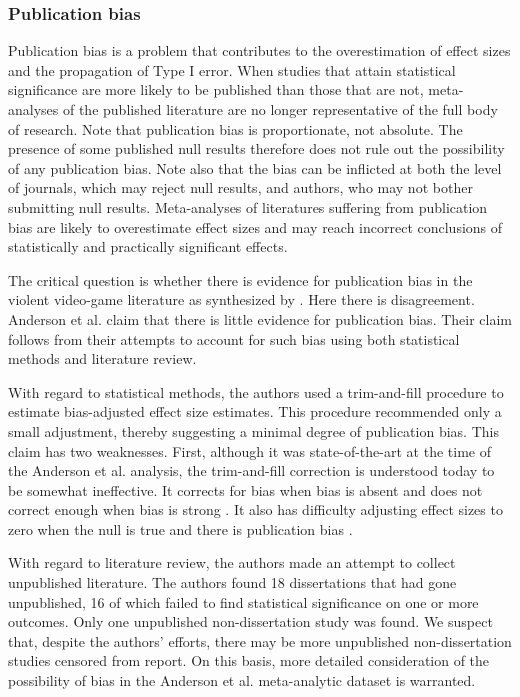 \documentclass[jou]{apa6}
\begin{document}
\subsubsection{Publication bias}
Publication bias is a problem that contributes to the overestimation of effect sizes and the propagation of Type I error. When studies that attain statistical significance are more likely to be published than those that are not, meta-analyses of the published literature are no longer representative of the full body of research. Note that publication bias is proportionate, not absolute. The presence of some published null results therefore does not rule out the possibility of any publication bias. Note also that the bias can be inflicted at both the level of journals, which may reject null results, and authors, who may not bother submitting null results.
Meta-analyses of literatures suffering from publication bias are likely to overestimate effect sizes and may reach incorrect conclusions of statistically and practically significant effects.

The critical question is whether there is evidence for publication bias in the violent video-game literature as synthesized by \citet{Anderson:etal:2010}.  Here there is disagreement.  Anderson et al. claim that there is little evidence for publication bias.  Their claim follows from their attempts to account for such bias using both statistical methods and literature review.  

With regard to statistical methods, the authors used a trim-and-fill procedure to estimate bias-adjusted effect size estimates. This procedure recommended only a small adjustment, thereby suggesting a minimal degree of publication bias. This claim has two weaknesses. First, although it was state-of-the-art at the time of the Anderson et al. analysis, the trim-and-fill correction is understood today to be somewhat ineffective. It corrects for bias when bias is absent and does not correct enough when bias is strong \citep{Simonsohn:etal:2014b,vanAssen:etal:2015}. It also has difficulty adjusting effect sizes to zero when the null is true and there is publication bias \citep{Moreno:etal:2009,vanAssen:etal:2015}. 

With regard to literature review, the authors made an attempt to collect unpublished literature. The authors found 18 dissertations that had gone unpublished, 16 of which failed to find statistical significance on one or more outcomes. Only one unpublished non-dissertation study was found. We suspect that, despite the authors' efforts, there may be more unpublished non-dissertation studies censored from report. On this basis, more detailed consideration of the possibility of bias in the Anderson et al. meta-analytic dataset is warranted.
\end{document}
